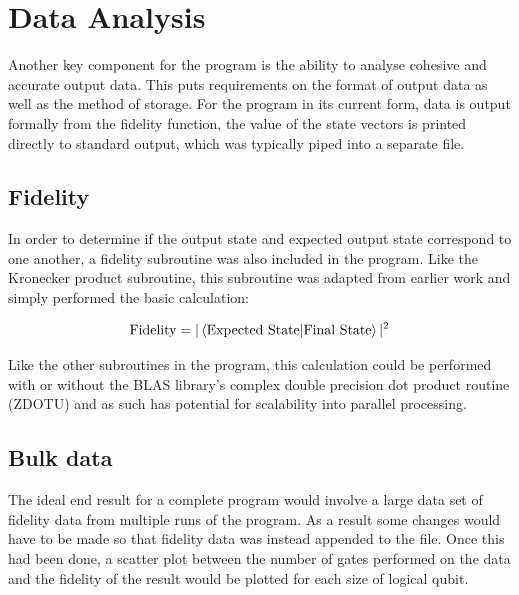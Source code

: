
\section{Data Analysis}

Another key component for the program is the ability to analyse cohesive and accurate output data. This puts requirements on the format of output data as well as the method of storage. For the program in its current form, data is output formally from the fidelity function, the value of the state vectors is printed directly to standard output, which was typically piped into a separate file.


\subsection{Fidelity}

In order to determine if the output state and expected output state correspond to one another, a fidelity subroutine was also included in the program. Like the Kronecker product subroutine, this subroutine was adapted from earlier work and simply performed the basic calculation:

\begin{equation}
\text{Fidelity} = |\braket{\text{Expected State}|\text{Final State}}|^{2}
\end{equation}

Like the other subroutines in the program, this calculation could be performed with or without the BLAS library's complex double precision dot product routine (ZDOTU) and as such has potential for scalability into parallel processing.


\subsection{Bulk data}

The ideal end result for a complete program would involve a large data set of fidelity data from multiple runs of the program. As a result some changes would have to be made so that fidelity data was instead appended to the file. Once this had been done, a scatter plot between the number of gates performed on the data and the fidelity of the result would be plotted for each size of logical qubit. 

